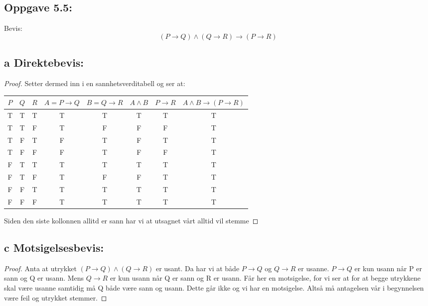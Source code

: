 \documentclass[a4paper, norsk, 10pt]{article}
\begin{document}
\begin{flushleft}
\section*{Oppgave 5.5:}
Bevis:
\[(P \rightarrow Q) \land (Q \rightarrow R) \rightarrow (P \rightarrow R)\]
\subsection*{a \quad Direktebevis:}
\begin{proof}
Setter dermed inn i en sannhetsverditabell og ser at:

\begin{table}[h!]
\begin{tabular}{c c c || c c c c c}
$P$ & $Q$ & $R$ & $A= P \rightarrow Q$ & $ B = Q \rightarrow R$ & $A \land B $ & $ P \rightarrow R$ & $A \land B \rightarrow (P \rightarrow R)$\\
\hline
T & T & T & T & T & T & T & T\\
T & T & F & T & F & F & F & T\\
T & F & T & F & T & F & T & T\\
T & F & F & F & T & F & F & T\\
F & T & T & T & T & T & T & T\\
F & T & F & T & F & F & T & T\\
F & F & T & T & T & T & T & T\\
F & F & F & T & T & T & T & T

\end{tabular}
\end{table}

Siden den siste kollonnen allitd er sann har vi at utsagnet vårt alltid vil stemme
\end{proof}

\subsection*{c \quad Motsigelsesbevis:}
\begin{proof}
Anta at utrykket $(P \rightarrow Q) \land (Q \rightarrow R) $ er usant. Da har vi at både $P \rightarrow Q$ og $Q \rightarrow R$ er usanne. $P \rightarrow Q$ er kun usann når P er sann og Q er usann. Mens $Q \rightarrow R$ er kun usann når Q er sann og R er usann. Får her en motsigelse, for vi ser at for at begge utrykkene skal være usanne samtidig må Q både være sann og usann. Dette går ikke og vi har en motsigelse. Altså må antagelsen vår i begynnelsen være feil og utrykket stemmer.
\end{proof}
\end{flushleft}
\end{document}
